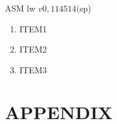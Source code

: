 \documentclass[a4paper]{article}  %
\begin{document}
\begin{codeblock}{ASM}
    lw $v0, 114514($sp)
\end{codeblock}

\begin{enumerate}[1]  %
    \item ITEM1
    \item ITEM2
    \item ITEM3
\end{enumerate}

\nocite{REF}
\small{
}

\newpage

\appendix
\section{APPENDIX\label{adx:ASM}}
\end{document}
